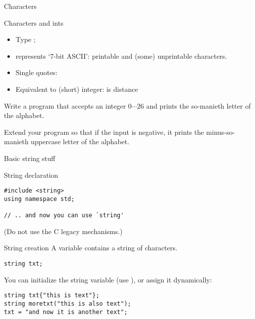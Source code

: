 
 {Characters}

\begin{block}{Characters and ints}
  \label{sl:int-char}
  \begin{itemize}
  \item Type ;
  \item represents `7-bit ASCII': printable and (some) unprintable
    characters.
  \item Single quotes: 
  \item Equivalent to (short) integer:  is distance 
  \end{itemize}
\end{block}

\begin{exercise}
  \label{ex:print-ichar}
  Write a program that accepts an integer $0\cdots26$ and prints the
  so-manieth letter of the alphabet.

  Extend your program so that if the input is negative, it prints the
  minus-so-manieth uppercase letter of the alphabet.
\end{exercise}

 {Basic string stuff}
\label{sec:string}

\begin{block}{String declaration}
  \label{sl:string-declare}
\begin{verbatim}
#include <string>
using namespace std;

// .. and now you can use `string'
\end{verbatim}
(Do not use the C legacy mechanisms.)
\end{block}

\begin{block}{String creation}
  \label{sl:string-create}
  A  variable contains a string of characters.
\begin{verbatim}
string txt;
\end{verbatim}
You can initialize the string variable (use ), or assign it dynamically:
\begin{verbatim}
string txt{"this is text"};
string moretxt("this is also text");
txt = "and now it is another text";
\end{verbatim}
\end{block}

